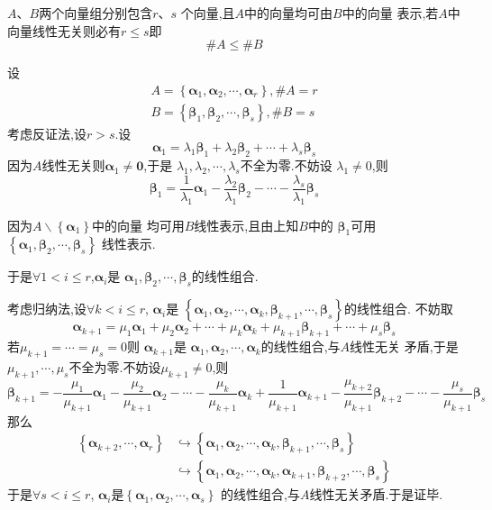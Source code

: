\begin{green}
\begin{lemma}[多少之间的线性关系]\label{lem:多少之间的线性关系}
    $A$、$B$两个向量组分别包含$r$、$s$
    个向量,且$A$中的向量均可由$B$中的向量
    表示,若$A$中向量线性无关则必有$r
    \leqslant s$即\[\#A \leqslant \#B\]
\end{lemma}
\begin{Proof}
设\begin{align*}
    A=\left\{\bm{\alpha}_1,\bm{\alpha}_2,\cdots
    ,\bm{\alpha}_r\right\},\#A=r\\
    B=\left\{\bm{\beta}_1,\bm{\beta}_2,\cdots,\bm{\beta}_s\right\},\#B=s
\end{align*}
考虑反证法,设$r>s$.设
\[
\bm{\alpha}_1=\lambda_1\bm{\beta}_1+\lambda_2\bm{\beta}_2+\cdots+\lambda_s\bm{\beta}_s
\]
因为$A$线性无关则$\bm{\alpha}_1\neq \bm{0}$,于是
$\lambda_1,\lambda_2,\cdots,\lambda_s$不全为零.不妨设
$\lambda_1\neq 0$,则
\[
\bm{\beta}_1=\frac{1}{\lambda_1}\bm{\alpha}_1-
\frac{\lambda_2}{\lambda_1}\bm{\beta}_2-\cdots-
\frac{\lambda_s}{\lambda_1}\bm{\beta}_s
\]

因为$A\backslash \left\{\bm{\alpha}_1\right\}$中的向量
均可用$B$线性表示,且由上知$B$中的
$\bm{\beta}_1$可用
$\left\{\bm{\alpha}_1,\bm{\beta}_2,\cdots,\bm{\beta}_s\right\}$
线性表示.

于是$\forall 1<i\leqslant r$,$\bm{\alpha}_i$是
$\bm{\alpha}_1,\bm{\beta}_2,\cdots,\bm{\beta}_s$的线性组合.

考虑归纳法,设$\forall k < i \leqslant r$,
$\bm{\alpha}_i$是
$\left\{\bm{\alpha}_1,
\bm{\alpha}_2,\cdots,\bm{\alpha}_k,
\bm{\beta}_{k+1},\cdots,\bm{\beta}_s\right\}$的线性组合.
不妨取
\[
\bm{\alpha}_{k+1}=\mu_{1}\bm{\alpha}_1+\mu_2\bm{\alpha}_2+\cdots+\mu_k\bm{\alpha}_k+
\mu_{k+1}\bm{\beta}_{k+1}+\cdots+\mu_s\bm{\beta}_s
\]
若$\mu_{k+1}=\cdots=\mu_{s}=0$则
$\bm{\alpha}_{k+1}$是
$\bm{\alpha}_1,\bm{\alpha}_2,
\cdots,\bm{\alpha}_k$的线性组合,与$A$线性无关
矛盾,于是
$\mu_{k+1},\cdots,\mu_s$不全为零.不妨设$\mu_{k+1}\neq 0$,则
\[
\bm{\beta}_{k+1}=
-\frac{\mu_1}{\mu_{k+1}}\bm{\alpha}_1-
\frac{\mu_2}{\mu_{k+1}}\bm{\alpha}_2-\cdots
-\frac{\mu_k}{\mu_{k+1}}\bm{\alpha}_k+
\frac{1}{\mu_{k+1}}\bm{\alpha}_{k+1}-
\frac{\mu_{k+2}}{\mu_{k+1}}\bm{\beta}_{k+2}-
\cdots-\frac{\mu_{s}}{\mu_{k+1}}\bm{\beta}_s
\]
那么
\begin{align*}
    \left\{\bm{\alpha}_{k+2},\cdots,\bm{\alpha}_r\right\}
    &\hookrightarrow 
    \left\{\bm{\alpha}_1,
\bm{\alpha}_2,\cdots,\bm{\alpha}_k,
\bm{\beta}_{k+1},\cdots,\bm{\beta}_s\right\}\\
&\hookrightarrow
\left\{\bm{\alpha}_1,
\bm{\alpha}_2,\cdots,\bm{\alpha}_k,\bm{\alpha}_{k+1},
\bm{\beta}_{k+2},\cdots,\bm{\beta}_s\right\}
\end{align*}
于是$\forall s < i \leqslant r$,
$\bm{\alpha}_i$是$\left\{\bm{\alpha}_1,\bm{\alpha}_2,\cdots,\bm{\alpha}_s\right\}$
的线性组合,与$A$线性无关矛盾.于是证毕.
\end{Proof}
\end{green}
